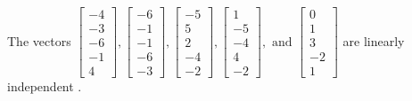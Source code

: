 \begin{exercise}
\begin{exerciseStatement}
  \end{exerciseStatement}
  \begin{exerciseAnswer}
   The vectors \(\left[\begin{array}{r}
-4 \\
-3 \\
-6 \\
-1 \\
4
\end{array}\right] , \left[\begin{array}{r}
-6 \\
-1 \\
-1 \\
-6 \\
-3
\end{array}\right] , \left[\begin{array}{r}
-5 \\
5 \\
2 \\
-4 \\
-2
\end{array}\right] , \left[\begin{array}{r}
1 \\
-5 \\
-4 \\
4 \\
-2
\end{array}\right] , \text{ and } \left[\begin{array}{r}
0 \\
1 \\
3 \\
-2 \\
1
\end{array}\right]\) are 
  	 linearly independent  .
  


  \end{exerciseAnswer}
\end{exercise}